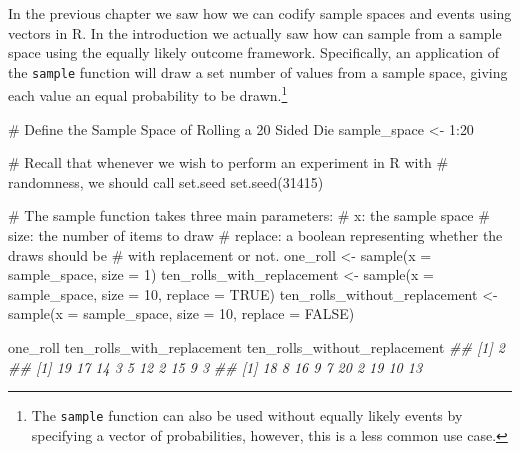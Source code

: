 \documentclass[
  letterpaper,
  DIV=11,
  numbers=noendperiod]{scrreprt}
\newenvironment{Shaded}{\begin{snugshade}}{\end{snugshade}}
\newcommand{\AttributeTok}[1]{\textcolor[rgb]{0.40,0.45,0.13}{#1}}
\newcommand{\CommentTok}[1]{\textcolor[rgb]{0.37,0.37,0.37}{#1}}
\newcommand{\ConstantTok}[1]{\textcolor[rgb]{0.56,0.35,0.01}{#1}}
\newcommand{\DecValTok}[1]{\textcolor[rgb]{0.68,0.00,0.00}{#1}}
\newcommand{\DocumentationTok}[1]{\textcolor[rgb]{0.37,0.37,0.37}{\textit{#1}}}
\newcommand{\FunctionTok}[1]{\textcolor[rgb]{0.28,0.35,0.67}{#1}}
\newcommand{\NormalTok}[1]{\textcolor[rgb]{0.00,0.23,0.31}{#1}}
\newcommand{\OtherTok}[1]{\textcolor[rgb]{0.00,0.23,0.31}{#1}}
\newcommand{\SpecialCharTok}[1]{\textcolor[rgb]{0.37,0.37,0.37}{#1}}
\theoremstyle{definition}
\theoremstyle{definition}
\theoremstyle{definition}
\theoremstyle{remark}
\begin{document}
In the previous chapter we saw how we can codify sample spaces and
events using vectors in R. In the introduction we actually saw how can
sample from a sample space using the equally likely outcome framework.
Specifically, an application of the \texttt{sample} function will draw a
set number of values from a sample space, giving each value an equal
probability to be drawn.\footnote{The \texttt{sample} function can also
  be used without equally likely events by specifying a vector of
  probabilities, however, this is a less common use case.}

\begin{Shaded}
\begin{Highlighting}[]
\CommentTok{\# Define the Sample Space of Rolling a 20 Sided Die}
\NormalTok{sample\_space }\OtherTok{\textless{}{-}} \DecValTok{1}\SpecialCharTok{:}\DecValTok{20}

\CommentTok{\# Recall that whenever we wish to perform an experiment in R with}
\CommentTok{\# randomness, we should call set.seed}
\FunctionTok{set.seed}\NormalTok{(}\DecValTok{31415}\NormalTok{)}

\CommentTok{\# The sample function takes three main parameters:}
\CommentTok{\#   x: the sample space}
\CommentTok{\#   size: the number of items to draw}
\CommentTok{\#   replace: a boolean representing whether the draws should be}
\CommentTok{\#            with replacement or not.}
\NormalTok{one\_roll }\OtherTok{\textless{}{-}} \FunctionTok{sample}\NormalTok{(}\AttributeTok{x =}\NormalTok{ sample\_space, }\AttributeTok{size =} \DecValTok{1}\NormalTok{)}
\NormalTok{ten\_rolls\_with\_replacement }\OtherTok{\textless{}{-}} \FunctionTok{sample}\NormalTok{(}\AttributeTok{x =}\NormalTok{ sample\_space, }
                                     \AttributeTok{size =} \DecValTok{10}\NormalTok{, }
                                     \AttributeTok{replace =} \ConstantTok{TRUE}\NormalTok{)}
\NormalTok{ten\_rolls\_without\_replacement }\OtherTok{\textless{}{-}} \FunctionTok{sample}\NormalTok{(}\AttributeTok{x =}\NormalTok{ sample\_space, }
                                        \AttributeTok{size =} \DecValTok{10}\NormalTok{, }
                                        \AttributeTok{replace =} \ConstantTok{FALSE}\NormalTok{)}

\NormalTok{one\_roll}
\NormalTok{ten\_rolls\_with\_replacement}
\NormalTok{ten\_rolls\_without\_replacement}
\DocumentationTok{\#\# [1] 2}
\DocumentationTok{\#\#  [1] 19 17 14  3  5 12  2 15  9  3}
\DocumentationTok{\#\#  [1] 18  8 16  9  7 20  2 19 10 13}
\end{Highlighting}
\end{Shaded}
\end{document}

